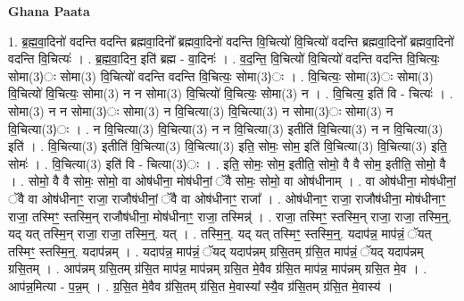 \documentclass[17pt]{extarticle}
\begin{document}
\textbf{Ghana Paata } \newline

1. ब्र॒ह्म॒वा॒दिनो॑ वदन्ति वदन्ति ब्रह्मवा॒दिनो᳚ ब्रह्मवा॒दिनो॑ वदन्ति वि॒चित्यो॑ वि॒चित्यो॑ वदन्ति ब्रह्मवा॒दिनो᳚ ब्रह्मवा॒दिनो॑ वदन्ति वि॒चित्यः॑ । . ब्र॒ह्म॒वा॒दिन॒ इति॑ ब्रह्म - वा॒दिनः॑ । . व॒द॒न्ति॒ वि॒चित्यो॑ वि॒चित्यो॑ वदन्ति वदन्ति वि॒चित्यः॒ सोमा(3)ः सोमा(3) वि॒चित्यो॑ वदन्ति वदन्ति वि॒चित्यः॒ सोमा(3)ः । . वि॒चित्यः॒ सोमा(3)ः सोमा(3) वि॒चित्यो॑ वि॒चित्यः॒ सोमा(3) न न सोमा(3) वि॒चित्यो॑ वि॒चित्यः॒ सोमा(3) न । . वि॒चित्य॒ इति॑ वि - चित्यः॑ । . सोमा(3) न न सोमा(3)ः सोमा(3) न वि॒चित्या(3) वि॒चित्या(3) न सोमा(3)ः सोमा(3) न वि॒चित्या(3)ः । . न वि॒चित्या(3) वि॒चित्या(3) न न वि॒चित्या(3) इतीति॑ वि॒चित्या(3) न न वि॒चित्या(3) इति॑ । . वि॒चित्या(3) इतीति॑ वि॒चित्या(3) वि॒चित्या(3) इति॒ सोमः॒ सोम॒ इति॑ वि॒चित्या(3) वि॒चित्या(3) इति॒ सोमः॑ । . वि॒चित्या(3) इति॑ वि - चित्या(3)ः । . इति॒ सोमः॒ सोम॒ इतीति॒ सोमो॒ वै वै सोम॒ इतीति॒ सोमो॒ वै । . सोमो॒ वै वै सोमः॒ सोमो॒ वा ओष॑धीना॒ मोष॑धीनां॒ ॅवै सोमः॒ सोमो॒ वा ओष॑धीनाम् । . वा ओष॑धीना॒ मोष॑धीनां॒ ॅवै वा ओष॑धीनाꣳ॒॒ राजा॒ राजौष॑धीनां॒ ॅवै वा ओष॑धीनाꣳ॒॒ राजा᳚ । . ओष॑धीनाꣳ॒॒ राजा॒ राजौष॑धीना॒ मोष॑धीनाꣳ॒॒ राजा॒ तस्मिꣳ॒॒ स्तस्मि॒न् राजौष॑धीना॒ मोष॑धीनाꣳ॒॒ राजा॒ तस्मिन्न्॑ । . राजा॒ तस्मिꣳ॒॒ स्तस्मि॒न् राजा॒ राजा॒ तस्मि॒न्॒. यद् यत् तस्मि॒न् राजा॒ राजा॒ तस्मि॒न्॒. यत् । . तस्मि॒न्॒. यद् यत् तस्मिꣳ॒॒ स्तस्मि॒न्॒. यदाप॑न्न॒ माप॑न्नं॒ ॅयत् तस्मिꣳ॒॒ स्तस्मि॒न्॒. यदाप॑न्नम् । . यदाप॑न्न॒ माप॑न्नं॒ ॅयद् यदाप॑न्नम् ग्रसि॒तम् ग्र॑सि॒त माप॑न्नं॒ ॅयद् यदाप॑न्नम् ग्रसि॒तम् । . आप॑न्नम् ग्रसि॒तम् ग्र॑सि॒त माप॑न्न॒ माप॑न्नम् ग्रसि॒त मे॒वैव ग्र॑सि॒त माप॑न्न॒ माप॑न्नम् ग्रसि॒त मे॒व । . आप॑न्न॒मित्या - प॒न्न॒म् । . ग्र॒सि॒त मे॒वैव ग्र॑सि॒तम् ग्र॑सि॒त मे॒वास्या᳚ स्यै॒व ग्र॑सि॒तम् ग्र॑सि॒त मे॒वास्य॑ । \newline
\end{document}
